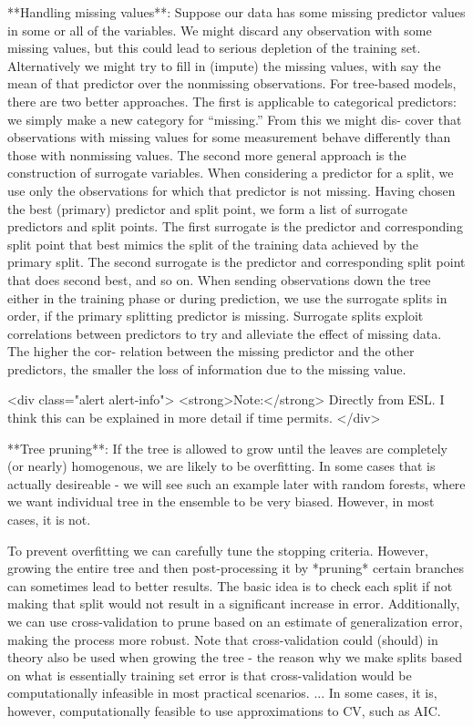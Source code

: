**Handling missing values**: Suppose our data has some missing predictor values in some or all of the
variables. We might discard any observation with some missing values, but
this could lead to serious depletion of the training set. Alternatively we
might try to fill in (impute) the missing values, with say the mean of that
predictor over the nonmissing observations. For tree-based models, there
are two better approaches. The first is applicable to categorical predictors:
we simply make a new category for “missing.” From this we might dis-
cover that observations with missing values for some measurement behave
differently than those with nonmissing values. The second more general
approach is the construction of surrogate variables. When considering a
predictor for a split, we use only the observations for which that predictor
is not missing. Having chosen the best (primary) predictor and split point,
we form a list of surrogate predictors and split points. The first surrogate
is the predictor and corresponding split point that best mimics the split of
the training data achieved by the primary split. The second surrogate is
the predictor and corresponding split point that does second best, and so
on. When sending observations down the tree either in the training phase
or during prediction, we use the surrogate splits in order, if the primary
splitting predictor is missing. Surrogate splits exploit correlations between
predictors to try and alleviate the effect of missing data. The higher the cor-
relation between the missing predictor and the other predictors, the smaller
the loss of information due to the missing value.

<div class="alert alert-info">
  <strong>Note:</strong> Directly from ESL. I think this can be explained in more detail if time permits.
</div>  

**Tree pruning**: If the tree is allowed to grow until the leaves are completely (or nearly) homogenous, we are likely to be overfitting. In some cases that is actually desireable - we will see such an example later with random forests, where we want individual tree in the ensemble to be very biased. However, in most cases, it is not.

To prevent overfitting we can carefully tune the stopping criteria. However, growing the entire tree and then post-processing it by *pruning* certain branches can sometimes lead to better results. The basic idea is to check each split if not making that split would not result in a significant increase in error. Additionally, we can use cross-validation to prune based on an estimate of generalization error, making the process more robust. Note that cross-validation could (should) in theory also be used when growing the tree - the reason why we make splits based on what is essentially training set error is that cross-validation would be computationally infeasible in most practical scenarios. ... In some cases, it is, however, computationally feasible to use approximations to CV, such as AIC.

